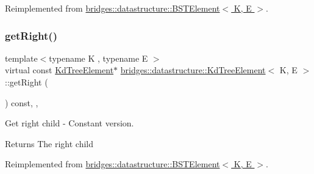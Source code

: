 Reimplemented from \hyperlink{classbridges_1_1datastructure_1_1_b_s_t_element_a80f5085d6d03805dd3091b7693d8e235}{bridges\+::datastructure\+::\+B\+S\+T\+Element$<$ K, E $>$}.

\mbox{\label{classbridges_1_1datastructure_1_1_kd_tree_element_ae8d6007d3848b72cbfc11d2e29120781}} 
\subsubsection{\texorpdfstring{get\+Right()}{getRight()}\hspace{0.1cm}{\footnotesize\ttfamily [2/2]}}
{\footnotesize\ttfamily template$<$typename K , typename E $>$ \\
virtual const \hyperlink{classbridges_1_1datastructure_1_1_kd_tree_element}{Kd\+Tree\+Element}$\ast$ \hyperlink{classbridges_1_1datastructure_1_1_kd_tree_element}{bridges\+::datastructure\+::\+Kd\+Tree\+Element}$<$ K, E $>$\+::get\+Right (\begin{DoxyParamCaption}{ }\end{DoxyParamCaption}) const\hspace{0.3cm}{\ttfamily [inline]}, {\ttfamily [override]}, {\ttfamily [virtual]}}



Get right child -\/ Constant version. 

\begin{DoxyReturn}{Returns}
The right child 
\end{DoxyReturn}


Reimplemented from \hyperlink{classbridges_1_1datastructure_1_1_b_s_t_element_a012f0eb09c3d62b14c73109e6ded0879}{bridges\+::datastructure\+::\+B\+S\+T\+Element$<$ K, E $>$}.

\mbox{\label{classbridges_1_1datastructure_1_1_kd_tree_element_ae75460d9b4cfbcf013b0376a8f2948ec}} 
